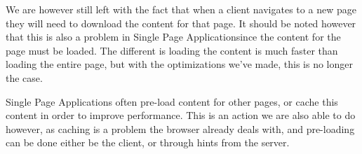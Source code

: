 \documentclass{article}[10pt]
\newcommand{\spa}{Single Page Application}
\begin{document}
We are however still left with the fact that when a client navigates to a new page they will need to download the content for that page. It should be noted however that this is also a problem in \spa since the content for the page must be loaded. The different is loading the content is much faster than loading the entire page, but with the optimizations we've made, this is no longer the case.

\spa s often pre-load content for other pages, or cache this content in order to improve performance. This is an action we are also able to do however, as caching is a problem the browser already deals with, and pre-loading can be done either be the client, or through hints from the server.




\end{document}
